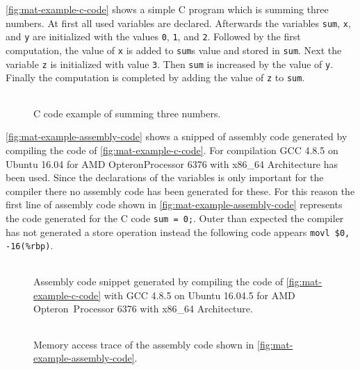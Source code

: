 \documentclass[onecolumn, openany, master, english, seal, signatures]{dbrgrptt}
\begin{document}
\autoref{fig:mat-example-c-code} shows a simple C program which is summing three numbers. At first all used variables are declared. Afterwards the variables \texttt{sum}, \texttt{x}, and \texttt{y} are initialized with the values \texttt{0}, \texttt{1}, and \texttt{2}. Followed by the first computation, the value of \texttt{x} is added to \texttt{sum}s value and stored in \texttt{sum}. Next the variable \texttt{z} is initialized with value \texttt{3}. Then \texttt{sum} is increased by the value of \texttt{y}. Finally the computation is completed by adding the value of \texttt{z} to \texttt{sum}.

\begin{figure}[h!]
  \centering
  \begin{tabular}{c}
  
  \end{tabular}
  \caption{C code example of summing three numbers.}
  \label{fig:mat-example-c-code}
\end{figure}

\autoref{fig:mat-example-assembly-code} shows a snipped of assembly code generated by compiling the code of \autoref{fig:mat-example-c-code}. For compilation GCC 4.8.5 on Ubuntu 16.04 for AMD Opteron\texttrademark Processor 6376 with x86\_64 Architecture has been used. Since the declarations of the variables is only important for the compiler there no assembly code has been generated for these. For this reason the first line of assembly code shown in \autoref{fig:mat-example-assembly-code} represents the code generated for the C code \texttt{sum = 0;}. Outer than expected the compiler has not generated a store operation instead the following code appears \texttt{movl \$0, -16(\%rbp)}.

\begin{figure}[h!]
  \centering
  \begin{tabular}{c}
  
  \end{tabular}
  \caption{Assembly code snippet generated by compiling the code of \autoref{fig:mat-example-c-code} with GCC 4.8.5 on Ubuntu 16.04.5 for AMD Opteron\texttrademark~Processor 6376 with x86\_64 Architecture.}
  \label{fig:mat-example-assembly-code}
\end{figure}

\begin{figure}[h!]
  \centering
  \begin{tabular}{c}
  
  \end{tabular}
  \caption{Memory access trace of the assembly code shown in \autoref{fig:mat-example-assembly-code}.}
  \label{fig:mat-example-trace}
\end{figure}
\end{document}
